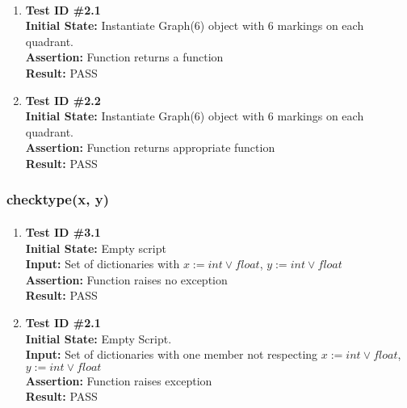 \documentclass[12pt, titlepage]{article}
\begin{document}
	\paragraph{}
		\begin{enumerate}
			\item{\textbf{Test ID \#2.1\\}}
			\textbf{Initial State:} Instantiate Graph(6) object with 6 markings on each quadrant.\\
			\textbf{Assertion:} Function returns a function \\
			\textbf{Result:} PASS
			
			\item{\textbf{Test ID \#2.2\\}}
			\textbf{Initial State:} Instantiate Graph(6) object with 6 markings on each quadrant.\\
			\textbf{Assertion:} Function returns appropriate function \\
			\textbf{Result:} PASS
		\end{enumerate}

\subsubsection{checktype(x, y)}		
	\label{sec:4.0.3}
	\paragraph{}
		\begin{enumerate}
			\item{\textbf{Test ID \#3.1\\}}
			\textbf{Initial State:} Empty script\\
			\textbf{Input:} Set of dictionaries with $x:= int \vee float$, $y:= int \vee float$ \\
			\textbf{Assertion:} Function raises no exception \\
			\textbf{Result:} PASS
			
			\item{\textbf{Test ID \#2.1\\}}
			\textbf{Initial State:} Empty Script.\\
			\textbf{Input:} Set of dictionaries with one member not respecting $x:= int \vee float$, $y:= int \vee float$ \\
			\textbf{Assertion:} Function raises exception \\
			\textbf{Result:} PASS
		\end{enumerate}
		
\end{document}
